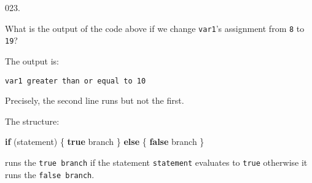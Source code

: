 \documentclass[]{book}
\newenvironment{Shaded}{}{}
\newcommand{\ControlFlowTok}[1]{\textcolor[rgb]{0.00,0.44,0.13}{\textbf{#1}}}
\newcommand{\KeywordTok}[1]{\textcolor[rgb]{0.00,0.44,0.13}{\textbf{#1}}}
\newcommand{\NormalTok}[1]{#1}
\begin{document}
\begin{minipage}{\linewidth}\noindent
{\tiny 023.}\\
\begin{minipage}[t]{.485\linewidth}

What is the output of the code above if we change \texttt{var1}'s
assignment from \texttt{8} to \texttt{19}?

\end{minipage}
\hfill
\begin{minipage}[t]{.485\linewidth}

The output is:

\begin{framed}

\begin{verbatim}
var1 greater than or equal to 10
\end{verbatim}

\end{framed}

Precisely, the second line runs but not the first.

The structure:

\begin{framed}

\begin{Shaded}
\begin{Highlighting}[]
\ControlFlowTok{if}\NormalTok{ (statement) \{}
  \KeywordTok{true}\NormalTok{ branch}
\NormalTok{\} }\ControlFlowTok{else}\NormalTok{ \{}
  \KeywordTok{false}\NormalTok{ branch}
\NormalTok{\}}
\end{Highlighting}
\end{Shaded}

\end{framed}

runs the \texttt{true\ branch} if the statement \texttt{statement}
evaluates to \texttt{true} otherwise it runs the \texttt{false\ branch}.

\end{minipage}
\end{minipage}

\vspace{2mm}\noindent\hrulefill{}
\end{document}
